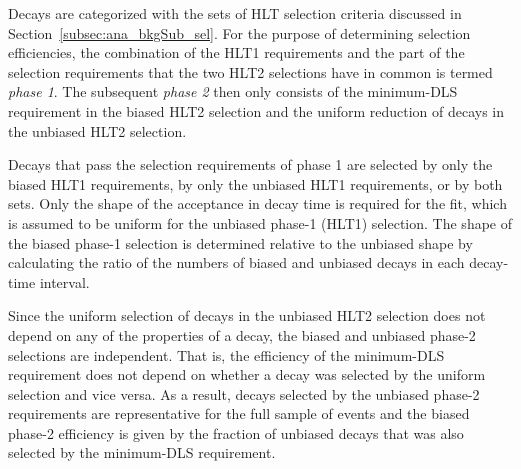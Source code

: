 Decays are categorized with the sets of HLT selection criteria discussed in Section~\ref{subsec:ana_bkgSub_sel}. For the purpose of
determining selection efficiencies, the combination of the HLT1 requirements and the part of the selection requirements that the two HLT2
selections have in common is termed \emph{phase 1}. The subsequent \emph{phase 2} then only consists of the minimum-DLS requirement in the
biased HLT2 selection and the uniform reduction of decays in the unbiased HLT2 selection.

Decays that pass the selection requirements of phase 1 are selected by only the biased HLT1 requirements, by only the unbiased HLT1
requirements, or by both sets. Only the shape of the acceptance in decay time is required for the fit, which is assumed to be uniform for
the unbiased phase-1 (HLT1) selection. The shape of the biased phase-1 selection is determined relative to the unbiased shape by
calculating the ratio of the numbers of biased and unbiased decays in each decay-time interval.

Since the uniform selection of decays in the unbiased HLT2 selection does not depend on any of the properties of a decay, the biased and
unbiased phase-2 selections are independent. That is, the efficiency of the minimum-DLS requirement does not depend on whether a decay was
selected by the uniform selection and vice versa. As a result, decays selected by the unbiased phase-2 requirements are representative for
the full sample of events and the biased phase-2 efficiency is given by the fraction of unbiased decays that was also selected by the
minimum-DLS requirement.

